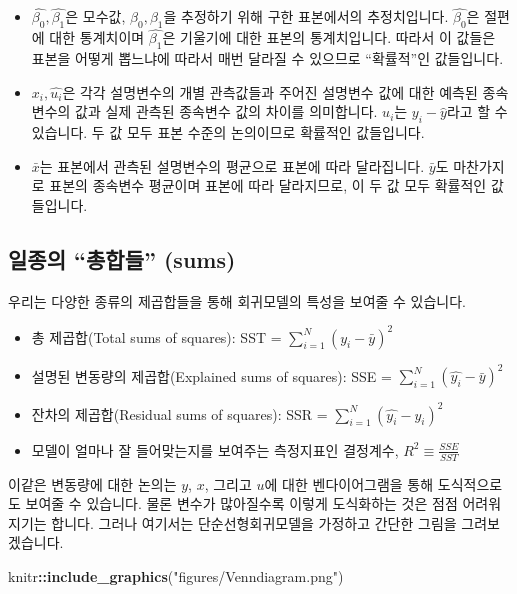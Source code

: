\documentclass[
]{book}
\newenvironment{Shaded}{\begin{snugshade}}{\end{snugshade}}
\newcommand{\KeywordTok}[1]{\textcolor[rgb]{0.13,0.29,0.53}{\textbf{#1}}}
\newcommand{\NormalTok}[1]{#1}
\newcommand{\OperatorTok}[1]{\textcolor[rgb]{0.81,0.36,0.00}{\textbf{#1}}}
\newcommand{\StringTok}[1]{\textcolor[rgb]{0.31,0.60,0.02}{#1}}
\begin{document}
\begin{itemize}
  \begin{itemize}
  \item
    \(\hat{\beta_0}, \hat{\beta_1}\)은 모수값, \(\beta_0, \beta_1\)을 추정하기 위해 구한 표본에서의 추정치입니다. \(\hat{\beta_0}\)은 절편에 대한 통계치이며 \(\hat{\beta_1}\)은 기울기에 대한 표본의 통계치입니다. 따라서 이 값들은 표본을 어떻게 뽑느냐에 따라서 매번 달라질 수 있으므로 ``확률적''인 값들입니다.
  \item
    \(x_i, \hat{u_i}\)은 각각 설명변수의 개별 관측값들과 주어진 설명변수 값에 대한 예측된 종속변수의 값과 실제 관측된 종속변수 값의 차이를 의미합니다. \(u_i\)는 \(y_i - \hat{y}\)라고 할 수 있습니다. 두 값 모두 표본 수준의 논의이므로 확률적인 값들입니다.
  \item
    \(\bar{x}\)는 표본에서 관측된 설명변수의 평균으로 표본에 따라 달라집니다. \(\bar{y}\)도 마찬가지로 표본의 종속변수 평균이며 표본에 따라 달라지므로, 이 두 값 모두 확률적인 값들입니다.
  \end{itemize}
\end{itemize}

\hypertarget{uxc77cuxc885uxc758-uxcd1duxd569uxb4e4-sums}{%
\subsection{일종의 ``총합들'' (sums)}\label{uxc77cuxc885uxc758-uxcd1duxd569uxb4e4-sums}}

우리는 다양한 종류의 제곱합들을 통해 회귀모델의 특성을 보여줄 수 있습니다.

\begin{itemize}
\item
  총 제곱합(Total sums of squares): SST = \(\sum^{N}_{i=1}(y_i-\bar{y})^2\)
\item
  설명된 변동량의 제곱합(Explained sums of squares): SSE = \(\sum^{N}_{i=1}(\hat{y_i}-\bar{y})^2\)
\item
  잔차의 제곱합(Residual sums of squares): SSR = \(\sum^{N}_{i=1}(\hat{y_i}-y_i)^2\)
\item
  모델이 얼마나 잘 들어맞는지를 보여주는 측정지표인 결정계수, \(R^2 \equiv \frac{SSE}{SST}\)
\end{itemize}

이같은 변동량에 대한 논의는 \(y\), \(x\), 그리고 \(u\)에 대한 벤다이어그램을 통해 도식적으로도 보여줄 수 있습니다. 물론 변수가 많아질수록 이렇게 도식화하는 것은 점점 어려워지기는 합니다. 그러나 여기서는 단순선형회귀모델을 가정하고 간단한 그림을 그려보겠습니다.
\newpage

\begin{Shaded}
\begin{Highlighting}[]
\NormalTok{knitr}\OperatorTok{::}\KeywordTok{include_graphics}\NormalTok{(}\StringTok{"figures/Venndiagram.png"}\NormalTok{)}
\end{Highlighting}
\end{Shaded}
\end{document}
